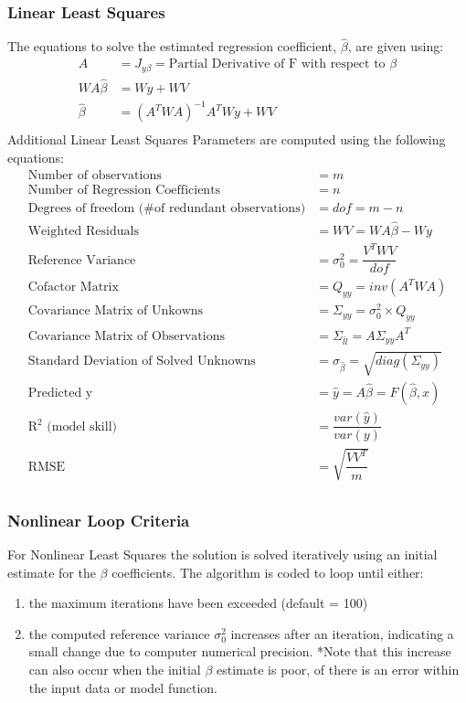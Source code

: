 \documentclass{article}
\begin{document}
	\subsubsection*{Linear Least Squares}
	The equations to solve the estimated regression coefficient, $\hat{\beta}$, are given using:
	\begin{align*}
	A &= J_{y\beta} = \text{Partial Derivative of F with respect to }\beta \\
	WA\hat{\beta} &= Wy + WV\\
	\hat{\beta} &= (A^TWA)^{-1}A^TWy + WV\\
	\end{align*}
	Additional Linear Least Squares Parameters are computed using the following equations:
	\begin{align*}
	\text{Number of observations} &= m \\ 
	\text{Number of Regression Coefficients} &= n  \\
	\text{Degrees of freedom (\# of redundant observations)} &= dof = m-n \\
	\text{Weighted Residuals} &= WV = WA\hat{\beta} - Wy\\
	\text{Reference Variance} &= \sigma_0^2 = \dfrac{V^TWV}{dof} \\
	\text{Cofactor Matrix} &= Q_{yy} = inv(A^TWA) \\
	\text{Covariance Matrix of Unkowns} &= \Sigma_{yy} = \sigma_0^2 \times Q_{yy} \\
	\text{Covariance Matrix of Observations} &= \Sigma_{\hat{l}\hat{l}} = A \Sigma_{yy} A^T \\
	\text{Standard Deviation of Solved Unknowns} &= \sigma_{\hat{\beta}} = \sqrt{diag(\Sigma_{yy})} \\
	\text{Predicted y} &= \hat{y} = A\hat{\beta} = F(\hat{\beta},x)\\
	\text{R$^2$ (model skill)} &= \dfrac{var(\hat{y})}{var(y)} \\
	\text{RMSE } &= \sqrt{\dfrac{VV^T}{m}} \\
	\end{align*}
	
	\clearpage
	\subsubsection*{Nonlinear Loop Criteria}
	For Nonlinear Least Squares the solution is solved iteratively using an initial estimate for the $\beta$ coefficients.  The algorithm is coded to loop until either:
	\begin{enumerate}[label=\alph*)]
		\item the maximum iterations have been exceeded (default = 100)
		\item the computed reference variance $\sigma_0^2$ increases after an iteration, indicating a small change due to computer numerical precision.  *Note that this increase can also occur when the initial $\beta$ estimate is poor, of there is an error within the input data or model function.
	\end{enumerate}
	
\end{document}

